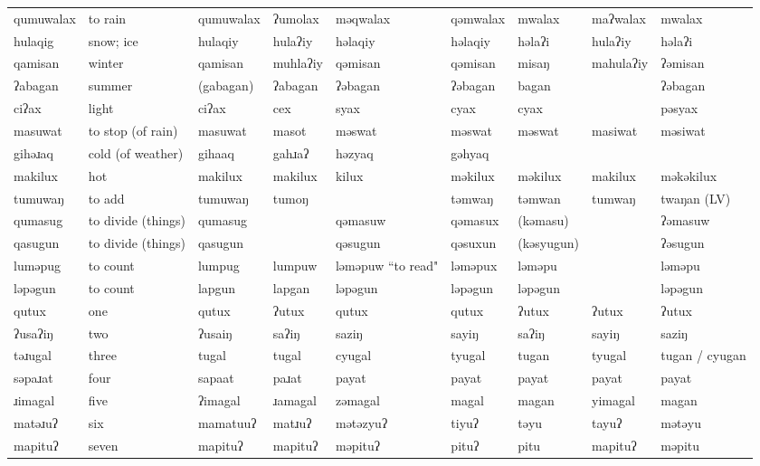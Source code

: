 \begin{landscape}
\begin{longtable}{*{9}{p{}}}
\text{*}qumuwalax & to rain & qumuwalax & ʔumolax & məqwalax & qəmwalax & mwalax & maʔwalax & mwalax\\
\text{*}hulaqig & snow; ice & hulaqiy & hulaʔiy & həlaqiy & həlaqiy & həlaʔi & hulaʔiy & həlaʔi\\
\text{*}qamisan & winter & qamisan & muhlaʔiy & qəmisan & qəmisan & misaŋ & mahulaʔiy & ʔəmisan\\
\text{*}ʔabagan & summer & (gabagan) & ʔabagan & ʔəbagan & ʔəbagan & bagan &  & ʔəbagan\\
\text{*}ciʔax & light & ciʔax & cex & syax & cyax & cyax &  & pəsyax\\
\text{*}masuwat & to stop (of rain) & masuwat & masot & məswat & məswat & məswat & masiwat & məsiwat\\
\text{*}gihəɹaq & cold (of weather) & gihaaq & gahɹaʔ & həzyaq & gəhyaq &  &  & \\
\text{*}makilux & hot & makilux & makilux & kilux & məkilux & məkilux & makilux & məkəkilux\\
\text{*}tumuwaŋ & to add & tumuwaŋ & tumoŋ &  & təmwaŋ & təmwan & tumwaŋ & twaŋan (LV)\\
\text{*}qumasug & to divide (things) & qumasug &  & qəmasuw & qəmasux & (kəmasu) &  & ʔəmasuw\\
\text{*}qasugun & to divide (things) & qasugun &  & qəsugun & qəsuxun & (kəsyugun) &  & ʔəsugun\\
\text{*}luməpug & to count & lumpug & lumpuw & ləməpuw ``to read" & ləməpux & ləməpu &  & ləməpu\\
\text{*}ləpəgun & to count & lapgun & lapgan & ləpəgun & ləpəgun & ləpəgun &  & ləpəgun\\
\text{*}qutux & one & qutux & ʔutux & qutux & qutux & ʔutux & ʔutux & ʔutux\\
\text{*}ʔusaʔiŋ & two & ʔusaiŋ & saʔiŋ & saziŋ & sayiŋ & saʔiŋ & sayiŋ & saziŋ\\
\text{*}təɹugal & three & tugal & tugal & cyugal & tyugal & tugan & tyugal & tugan / cyugan\\
\text{*}səpaɹat & four & sapaat & paɹat & payat & payat & payat & payat & payat\\
\text{*}ɹimagal & five & ʔimagal & ɹamagal & zəmagal & magal & magan & yimagal & magan\\
\text{*}matəɹuʔ & six & mamatuuʔ & matɹuʔ & mətəzyuʔ & tiyuʔ & təyu & tayuʔ & mətəyu\\
\text{*}mapituʔ & seven & mapituʔ & mapituʔ & məpituʔ & pituʔ & pitu & mapituʔ & məpitu\\

\end{longtable}
\end{landscape}
